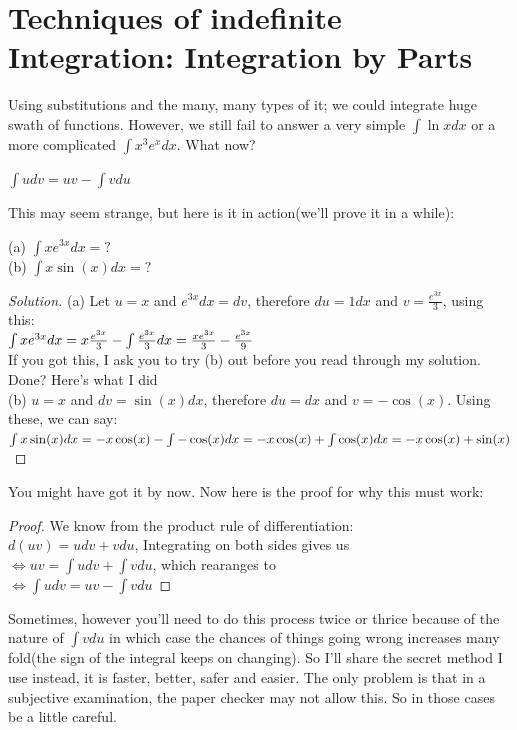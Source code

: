 \section{Techniques of indefinite Integration: Integration by Parts}
Using substitutions and the many, many types of it; we could integrate huge swath of functions. However, we still fail to answer a very simple $\int \ln{x} dx$ or a more complicated $\int x^3e^x dx$. What now?\\
\begin{theorem}
    $\int u dv = uv - \int v du$
\end{theorem}
This may seem strange, but here is it in action(we'll prove it in a while):\\
\begin{example}
    (a) $\int xe^{3x} dx =?$\\
    (b) $\int x\sin(x) dx =?$
\end{example}
\begin{proof}
    [Solution]
    (a) Let $u=x$ and $e^{3x}dx=dv$, therefore $du=1dx$ and $v=\frac{e^{3x}}{3}$, using this:\\
    $\int xe^{3x}dx=x\frac{e^{3x}}{3}-\int \frac{e^{3x}}{3} dx\\
    = \frac{xe^{3x}}{3}-\frac{e^{3x}}{9}$\\
    If you got this, I ask you to try (b) out before you read through my solution.\\
    Done? Here's what I did\\
    (b) $u=x$ and $dv=\sin(x)dx$, therefore $du=dx$ and $v=-\cos(x)$. Using these, we can say:\\
    $
    \int x\sin(x) dx = -x\cos(x)-\int-\cos(x)dx\\
    = -x\cos(x)+\int\cos(x)dx\\
    = -x\cos(x)+\sin(x)\\
    $
\end{proof}
You might have got it by now. Now here is the proof for why this must work:\\
\begin{proof}
    We know from the product rule of differentiation:\\
    $d(uv)=udv+vdu$, Integrating on both sides gives us\\
    $\iff uv = \int udv + \int vdu$, which rearanges to\\
    $\iff \int udv = uv - \int vdu$
\end{proof}
Sometimes, however you'll need to do this process twice or thrice because of the nature of $\int vdu$ in which case the chances of things going wrong increases many fold(the sign of the integral keeps on changing). So I'll share the secret method I use instead, it is faster, better, safer and easier. The only problem is that in a subjective examination, the paper checker may not allow this. So in those cases be a little careful.\\
